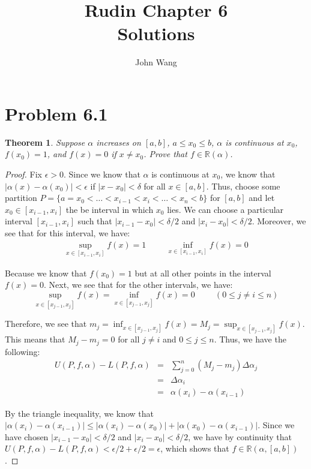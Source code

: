 \documentclass[psamsfonts]{amsart}
\title{Rudin Chapter 6\\
Solutions}
\author{John Wang}
\newtheorem{thm}{Theorem}[section]
\theoremstyle{definition}
\theoremstyle{remark}
\numberwithin{equation}{section}
\begin{document}
\maketitle

\section{Problem 6.1}

\begin{thm}
Suppose $\alpha$ increases on $[a,b]$, $a \leq x_0 \leq b$, $\alpha$ is continuous at $x_0$, $f(x_0) = 1$, and $f(x) = 0$ if $x \neq x_0$. Prove that $f \in \mathbb{R}(\alpha)$. 
\end{thm}

\begin{proof}
Fix $\epsilon > 0$. Since we know that $\alpha$ is continuous at $x_0$, we know that $|\alpha(x) - \alpha(x_0)| < \epsilon$ if $|x - x_0| < \delta$ for all $x \in [a,b]$. Thus, choose some partition $P = \{a = x_0 < \ldots < x_{i-1} < x_i < \ldots < x_n < b \}$ for $[a,b]$ and let $x_0 \in [x_{i-1},x_i]$ the be interval in which $x_0$ lies. We can choose a particular interval $[x_{i-1},x_i]$ such that $| x_{i-1} - x_0 | < \delta/2$ and $|x_i - x_0 | < \delta/2$. Moreover, we see that for this interval, we have:
\begin{eqnarray}
\sup_{x \in [x_{i-1},x_i]} f(x) = 1 \hspace{1cm} \inf_{x \in [x_{i-1},x_i]} f(x) = 0
\end{eqnarray}

Because we know that $f(x_0) = 1$ but at all other points in the interval $f(x) = 0$. Next, we see that for the other intervals, we have:
\begin{equation}
\sup_{x \in [x_{j-1},x_j]} f(x) = \inf_{x \in [x_{j-1},x_j]} f(x) = 0 \hspace{1cm} ( 0 \leq j \neq i\leq n )
\end{equation}

Therefore, we see that $m_j = \inf_{x \in [x_{j-1},x_j]} f(x) = M_j = \sup_{x \in [x_{j-1},x_j]} f(x)$. This means that $M_j - m_j = 0$ for all $j \neq i$ and $0 \leq j \leq n$. Thus, we have the following:
\begin{eqnarray}
U(P,f,\alpha) - L(P,f,\alpha) &=& \sum_{j = 0}^n (M_j - m_j) \Delta \alpha_j \\
&=& \Delta \alpha_i \\
&=& \alpha(x_i) - \alpha(x_{i-1}) 
\end{eqnarray}

By the triangle inequality, we know that $|\alpha(x_i) - \alpha(x_{i-1})|\leq |\alpha(x_i) - \alpha(x_0)| + |\alpha(x_0) - \alpha(x_{i-1}) |$. Since we have chosen $|x_{i-1} - x_0| < \delta/2$ and $|x_i - x_0| < \delta/2$, we have by continuity that $U(P,f,\alpha) - L(P,f,\alpha) < \epsilon/2 + \epsilon/2 = \epsilon$, which shows that $f \in \mathbb{R}(\alpha, [a,b])$. 
\end{proof}
\end{document}
